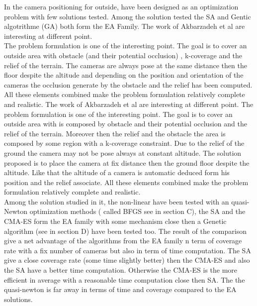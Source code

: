 In \cite{141*akbarzadeh2013} the camera positioning for outside, have been designed as an optimization problem with few solutions tested. Among the solution tested the SA and Gentic algotrithme (GA) both form the EA Family. 
The work of Akbarzadeh et al \cite{141*akbarzadeh2013} are interesting at different point. \\
The problem formulation is one of the interesting point. The goal is to cover an outside area with obstacle (and their potential occlusion) , k-coverage and the relief of the terrain. The cameras are always pose at the same distance then the floor despite the altitude and depending on the position  and orientation of the cameras the  occlusion generate by the obstacle and the relief has been computed. All these elements combined make the problem formulation relatively complete and realistic.
The work of Akbarzadeh et al \cite{141*akbarzadeh2013} are interesting at different point. 
The problem formulation is one of the interesting point. The goal is to cover an outside area with is composed by obstacle and their potential occlusion and the relief of the terrain. Moreover then the relief and the obstacle the area is composed by some region with a k-coverage constraint. 
Due to the relief of the ground the camera may not be pose  always  at constant altitude. The solution proposed is to  place the  camera at fix distance then the ground floor despite the altitude. Like that the altitude of a camera is automatic deduced form his position and the relief associate.  
  All these elements combined make the problem formulation relatively complete and realistic.\\
 Among the solution studied in it, the non-linear have been tested with an quasi-Newton optimization methods ( called BFGS see in \cite{141*akbarzadeh2013} section C), the SA and the CMA-ES  form the EA family with some mechanism close then a Genetic algorithm (see in \cite{141*akbarzadeh2013} section D) have been tested too.
The result of the comparison give a net advantage of the algorithms from the EA family  n term of   coverage rate with a fix number of cameras but also in term of time computation. 
 The SA give a close coverage rate (some time slightly better) then the CMA-ES and also the SA have a better time computation. Otherwise the CMA-ES is the more efficient in average with a reasonable time computation close then SA. The the quasi-newton is far away in terms of time and coverage compared to the EA solutions.\\
 
